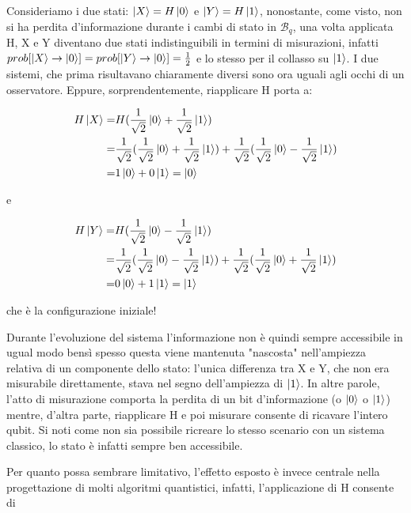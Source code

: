 \documentclass[12pt,a4paper,openright]{report}
\begin{document}
Consideriamo i due stati: $\ket{X} = H\ket0$ e $\ket{Y} = H\ket1$, nonostante, come visto, non si ha perdita d'informazione
durante i cambi di stato in $\mathcal{B}_q$, una volta applicata H, X e Y diventano due stati indistinguibili in termini di misurazioni, 
infatti $prob[\ket{X}\rightarrow\ket0]=prob[\ket{Y}\rightarrow\ket0]=\frac{1}{2}$ e lo stesso per il collasso su $\ket1$. I due sistemi, che prima risultavano chiaramente diversi sono ora uguali
agli occhi di un osservatore. Eppure, sorprendentemente, riapplicare H porta a: 
\begin{center}
    \begin{align*}
        H\ket{X} =& H(\frac{1}{\sqrt2}\ket0 + \frac{1}{\sqrt2}\ket1) \\
                  =&\frac{1}{\sqrt2}(\frac{1}{\sqrt2}\ket0 + \frac{1}{\sqrt2}\ket1) + \frac{1}{\sqrt2}(\frac{1}{\sqrt2}\ket0 - \frac{1}{\sqrt2}\ket1) \\
                  =& 1\ket0 + 0\ket1 =\ket0
    \end{align*}
\end{center}
e
\begin{center}
    \begin{align*}
         H\ket{Y} =& H(\frac{1}{\sqrt2}\ket0 - \frac{1}{\sqrt2}\ket1) \\
                  =&\frac{1}{\sqrt2}(\frac{1}{\sqrt2}\ket0 - \frac{1}{\sqrt2}\ket1) + \frac{1}{\sqrt2}(\frac{1}{\sqrt2}\ket0 + \frac{1}{\sqrt2}\ket1) \\
                  =& 0\ket0 + 1\ket1 =\ket1
    \end{align*}
\end{center}
che è la configurazione iniziale!\par Durante l'evoluzione del sistema l'informazione non è quindi sempre accessibile in ugual modo bensì
spesso questa viene mantenuta "nascosta" nell'ampiezza relativa di un componente dello stato: l'unica differenza tra X e Y, che non era misurabile direttamente,
stava nel segno dell'ampiezza di $\ket1$. In altre parole, l'atto di misurazione comporta la perdita di un bit d'informazione (o $\ket0$ o $\ket1$)  mentre, 
d'altra parte, riapplicare H e poi misurare consente di ricavare l'intero qubit. Si noti come non sia possibile ricreare lo stesso scenario con un sistema classico,
lo stato è infatti sempre ben accessibile.\par
Per quanto possa sembrare limitativo, l'effetto esposto è invece centrale nella progettazione di molti algoritmi quantistici, infatti, l'applicazione di H consente di
\end{document}
